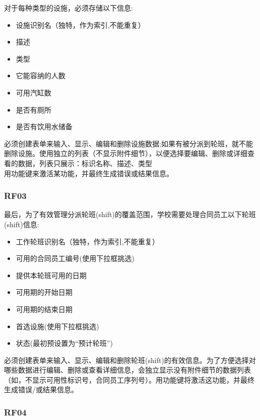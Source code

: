 对于每种类型的设施，必须存储以下信息: \\

\begin{itemize}
\tightlist
\item
  设施识别名（独特，作为索引,不能重复）
\item
  描述
\item
  类型
\item
  它能容纳的人数
\item
  可用汽缸数
\item
  是否有厕所
\item
  是否有饮用水储备
\end{itemize}

必须创建表单来输入、显示、编辑和删除设施数据;如果有被分派到轮班，就不能删除设施。使用独立的列表（不显示附件细节），以便选择要编辑、删除或详细查看的数据，列表只展示：标识名称、描述、类型\\
用功能键来激活某功能，并最终生成错误或结果信息。 \\

\hypertarget{ux63a5ux4e58ux5ba2}{%
\subsubsection{RF03}\label{ux63a5ux4e58ux5ba2}}

最后，为了有效管理分派轮班(shift)的覆盖范围，学校需要处理合同员工以下轮班(shift)信息: \\

\begin{itemize}
\tightlist
\item
  工作轮班识别名（独特，作为索引,不能重复）
\item
  可用的合同员工编号(使用下拉框挑选)
\item
  提供本轮班可用的日期
\item
  可用期的开始日期
\item
  可用期的结束日期
\item
  首选设施(使用下拉框挑选)
\item
  状态(最初预设置为“预计轮班”)
\end{itemize}

必须创建表单来输入、显示、编辑和删除轮班(shift)的有效信息。为了方便选择对哪些数据进行编辑、删除或查看详细信息，会独立显示没有附件细节的数据列表（如，不显示可用性标识号，合同员工序列号）。用功能键将激活这功能，并最终生成错误/或结果信息。 \\

\hypertarget{ux63a5ux4e58ux5ba2}{%
\subsubsection{RF04}\label{ux63a5ux4e58ux5ba2}}

